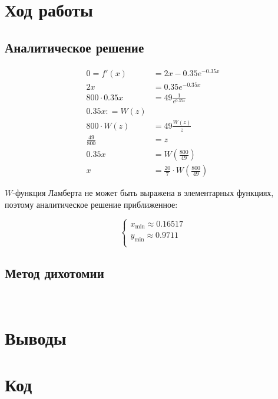 \section{Ход работы}

\subsection{Аналитическое решение}

\begin{multicols}{2}
    \begin{align*}
        0 = f'(x)        & = 2x - 0.35 e^{ - 0.35x}                          \\
        2x               & = 0.35 e^{ - 0.35x}                               \\
        800 \cdot 0.35 x & = 49 \frac{1}{e^{0.35 x}}                         \\
        0.35 x : = W(z)                                                      \\
        800 \cdot W(z)   & = 49 \frac{W(z)}{z}                               \\
        \frac{49}{800}   & = z                                               \\
        0.35 x           & = W\left(\frac{800}{49}\right)                    \\
        x                & = \frac{20}{7} \cdot W\left(\frac{800}{49}\right)
    \end{align*}

    \(W\)-функция Ламберта не может быть выражена в элементарных функциях, поэтому аналитическое решение приближенное:

    \[\begin{cases}
            x_{\min} \approx 0.16517 \\
            y_{\min} \approx 0.9711  \\
        \end{cases}\]
    \columnbreak

\end{multicols}



\subsection{Метод дихотомии}

\\[2mm]


\section{Выводы}


\newpage
\section{Код}



